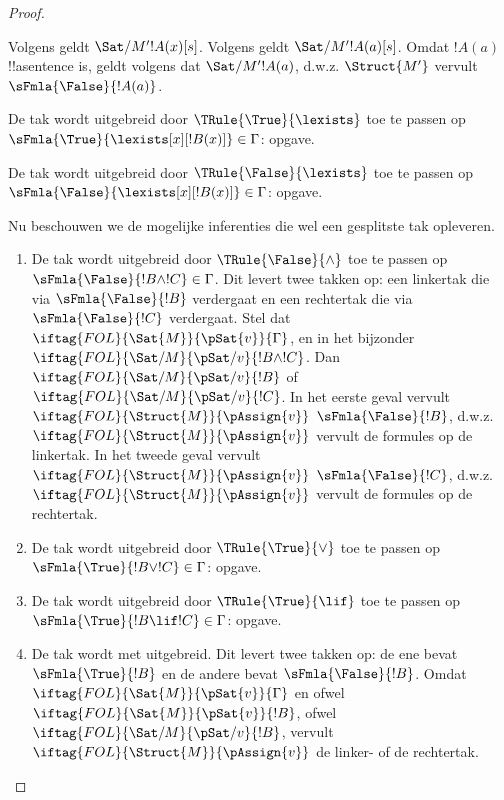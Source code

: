\documentclass[../../../include/open-logic-section]{subfiles}
\begin{document}
\begin{proof}
\begin{enumerate}
{  Volgens  geldt
  $\Sat/{M'}{!A(x)}[s]$. Volgens
   geldt $\Sat/{M'}{!A(a)}[s]$.
  Omdat $!A(a)$ !!a{sentence} is, geldt volgens
   dat
  $\Sat/{M'}{!A(a)}$, d.w.z. $\Struct{M'}$ vervult
  $\sFmla{\False}{!A(a)}$.
\item De tak wordt uitgebreid door $\TRule{\True}{\lexists}$ toe te
  passen op $\sFmla{\True}{\lexists[x][!B(x)]} \in \Gamma$: opgave.
\item De tak wordt uitgebreid door $\TRule{\False}{\lexists}$ toe te
  passen op $\sFmla{\False}{\lexists[x][!B(x)]} \in \Gamma$: opgave.}{}
\end{enumerate}
Nu beschouwen we de mogelijke inferenties die wel een gesplitste tak
opleveren.
\begin{enumerate}
\item De tak wordt uitgebreid door $\TRule{\False}{\land}$ toe te
  passen op $\sFmla{\False}{!B \land !C} \in \Gamma$. Dit levert twee
  takken op: een linkertak die via $\sFmla{\False}{!B}$ verdergaat en
  een rechtertak die via $\sFmla{\False}{!C}$ verdergaat. Stel dat
  $\iftag{FOL}{\Sat{M}}{\pSat{v}}{\Gamma}$, en in het bijzonder
  $\iftag{FOL}{\Sat/{M}}{\pSat/{v}}{!B \land !C}$. Dan
  $\iftag{FOL}{\Sat/{M}}{\pSat/{v}}{!B}$ of
  $\iftag{FOL}{\Sat/{M}}{\pSat/{v}}{!C}$. In het eerste geval vervult
  $\iftag{FOL}{\Struct{M}}{\pAssign{v}}$
  $\sFmla{\False}{!B}$, d.w.z.
  $\iftag{FOL}{\Struct{M}}{\pAssign{v}}$ vervult de formules op de
  linkertak. In het tweede geval vervult
  $\iftag{FOL}{\Struct{M}}{\pAssign{v}}$ $\sFmla{\False}{!C}$, d.w.z.
  $\iftag{FOL}{\Struct{M}}{\pAssign{v}}$ vervult de formules op de
  rechtertak.
\item De tak wordt uitgebreid door $\TRule{\True}{\lor}$ toe te
  passen op $\sFmla{\True}{!B \lor !C} \in \Gamma$: opgave.
\item De tak wordt uitgebreid door $\TRule{\True}{\lif}$ toe te
  passen op $\sFmla{\True}{!B \lif !C} \in \Gamma$: opgave.
\item De tak wordt met \Cut uitgebreid. Dit levert twee takken op:
  de ene bevat $\sFmla{\True}{!B}$ en de andere bevat
  $\sFmla{\False}{!B}$. Omdat $\iftag{FOL}{\Sat{M}}{\pSat{v}}{\Gamma}$
  en ofwel $\iftag{FOL}{\Sat{M}}{\pSat{v}}{!B}$, ofwel
  $\iftag{FOL}{\Sat/{M}}{\pSat/{v}}{!B}$,
  vervult $\iftag{FOL}{\Struct{M}}{\pAssign{v}}$ de linker- of de
  rechtertak.
\end{enumerate}
\end{proof}
\end{document}
